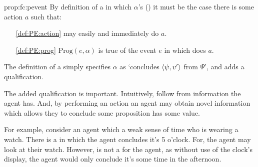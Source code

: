 \begin{note}[\fc{2} definition]
  \begin{argument}{prop:fc:pevent}
    By definition of a \pevent{} in which \vAgent{} \(\alpha\)'s (\peventpage{}) it must be the case there is some action \(a\) such that:
    \begin{enumerate}[noitemsep]
    \item[\ref{def:PE:action}]
      \vAgent{} may easily and immediately do \(a\).
    \item[\ref{def:PE:prog}]
      \(\text{Prog}(e, \alpha)\) is true of the event \(e\) in which \vAgent{} does \(a\).
    \end{enumerate}
    The definition of a \fc{} simply specifies \(\alpha\) as `concludes \(\langle \psi, v' \rangle\) from \(\Psi\)', and adds a qualification.
  \end{argument}

  The added qualification is important.
  Intuitively,  follow from information the agent has.
  And, by performing an action an agent may obtain novel information which allows they to conclude some proposition has some value.

  For example, consider an agent which a weak sense of time who is wearing a watch.
  There is a \pevent{} in which the agent concludes it's 5 o'clock.
  For, the agent may look at their watch.
  However,  is not a \fc{} for the agent, as without use of the clock's display, the agent would only conclude it's some time in the afternoon.
\end{note}

